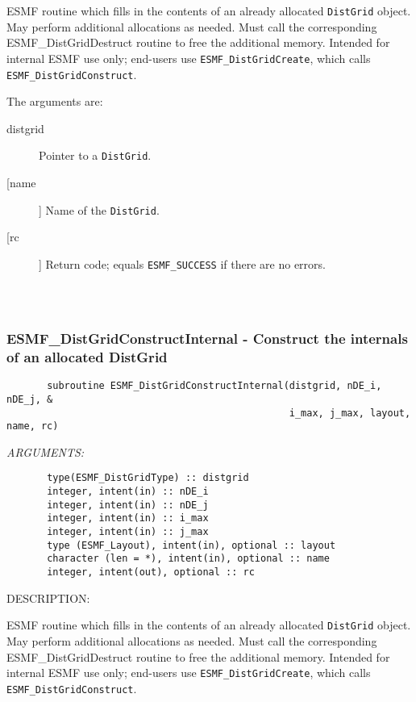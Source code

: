        ESMF routine which fills in the contents of an already
       allocated {\tt DistGrid} object.  May perform additional allocations
       as needed.  Must call the corresponding ESMF\_DistGridDestruct
       routine to free the additional memory.  Intended for internal
       ESMF use only; end-users use {\tt ESMF\_DistGridCreate}, which calls
       {\tt ESMF\_DistGridConstruct}. 
  
       The arguments are:
       \begin{description}
       \item[distgrid] 
            Pointer to a {\tt DistGrid}.
       \item[[name]] 
            Name of the {\tt DistGrid}.
       \item[[rc]] 
            Return code; equals {\tt ESMF\_SUCCESS} if there are no errors.
       \end{description}
  
\begin{verbatim} \end{verbatim}
 
 
\mbox{}\hrulefill\ 
 
\subsubsection{ESMF\_DistGridConstructInternal - Construct the internals of an allocated DistGrid}


\begin{verbatim}       subroutine ESMF_DistGridConstructInternal(distgrid, nDE_i, nDE_j, &
                                                 i_max, j_max, layout, name, rc)\end{verbatim}{\em ARGUMENTS:}
\begin{verbatim}       type(ESMF_DistGridType) :: distgrid 
       integer, intent(in) :: nDE_i
       integer, intent(in) :: nDE_j
       integer, intent(in) :: i_max
       integer, intent(in) :: j_max
       type (ESMF_Layout), intent(in), optional :: layout
       character (len = *), intent(in), optional :: name  
       integer, intent(out), optional :: rc               \end{verbatim}
{\sf DESCRIPTION:\\ }


       ESMF routine which fills in the contents of an already
       allocated {\tt DistGrid} object.  May perform additional allocations
       as needed.  Must call the corresponding ESMF\_DistGridDestruct
       routine to free the additional memory.  Intended for internal
       ESMF use only; end-users use {\tt ESMF\_DistGridCreate}, which calls
       {\tt ESMF\_DistGridConstruct}. 
  
